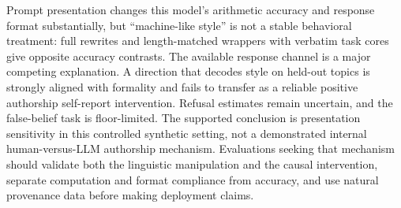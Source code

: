 Prompt presentation changes this model's arithmetic accuracy and response format substantially, but ``machine-like style'' is not a stable behavioral treatment: full rewrites and length-matched wrappers with verbatim task cores give opposite accuracy contrasts. The available response channel is a major competing explanation. A direction that decodes style on held-out topics is strongly aligned with formality and fails to transfer as a reliable positive authorship self-report intervention. Refusal estimates remain uncertain, and the false-belief task is floor-limited. The supported conclusion is presentation sensitivity in this controlled synthetic setting, not a demonstrated internal human-versus-LLM authorship mechanism. Evaluations seeking that mechanism should validate both the linguistic manipulation and the causal intervention, separate computation and format compliance from accuracy, and use natural provenance data before making deployment claims.
